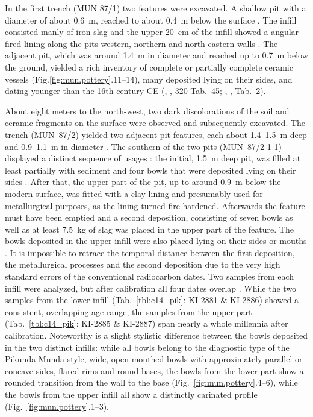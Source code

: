 \documentclass[a4paper]{article}
\begin{document}
In the first trench (MUN 87/1) two features were excavated. A shallow pit with a diameter of about 0.6~m, reached to about 0.4~m below the surface \citep[311--321]{Seidensticker.2021e}. The infill consisted manly of iron slag and the upper 20~cm of the infill showed a angular fired lining along the pits western, northern and north-eastern walls \citep[315 Fig. 151--152]{Seidensticker.2021e}. The adjacent pit, which was around 1.4~m in diameter and reached up to 0.7~m below the ground, yielded a rich inventory of complete or partially complete ceramic vessels (Fig.\ref{fig:mun.pottery}.11--14), many deposited lying on their sides, and dating younger than the 16th century CE (\citeauthor{Seidensticker.2021e}, \citeyear{Seidensticker.2021e}, 320 Tab.~45; \citeauthor{Seidensticker.2024}, \citeyear{Seidensticker.2024}, Tab.~2). 

About eight meters to the north-west, two dark discolorations of the soil and ceramic fragments on the surface were observed and subsequently excavated. The trench (MUN~87/2) yielded two adjacent pit features, each about 1.4--1.5~m deep and 0.9--1.1~m in diameter \citep[321--335]{Seidensticker.2021e}. The southern of the two pits (MUN~87/2-1-1) displayed a distinct sequence of usages \citep[329 Fig.~163]{Seidensticker.2021e}: the initial, 1.5~m deep pit, was filled at least partially with sediment and four bowls \citep[473 Pl.~91.6--8]{Seidensticker.2021e} that were deposited lying on their sides \citep[323 Fig.157G--H]{Seidensticker.2021e}. After that, the upper part of the pit, up to around 0.9~m below the modern surface, was fitted with a clay lining and presumably used for metallurgical purposes, as the lining turned fire-hardened. Afterwards the feature must have been emptied and a second deposition, consisting of seven bowls \citep[473 Pl.~91.1--5]{Seidensticker.2021e} as well as at least 7.5~kg of slag was placed in the upper part of the feature. The bowls deposited in the upper infill were also placed lying on their sides or mouths \citep[323 Fig.157A--E]{Seidensticker.2021e}. It is impossible to retrace the temporal distance between the first deposition, the metallurgical processes and the second deposition due to the very high standard errors of the conventional radiocarbon dates. Two samples from each infill were analyzed, but after calibration all four dates overlap \citep[328 Fig.~162]{Seidensticker.2021e}. While the two samples from the lower infill (Tab.~\ref{tbl:c14_pik}: KI-2881 \& KI-2886) showed a consistent, overlapping age range, the samples from the upper part (Tab.~\ref{tbl:c14_pik}: KI-2885 \& KI-2887) span nearly a whole millennia after calibration. Noteworthy is a slight stylistic difference between the bowls deposited in the two distinct infills: while all bowls belong to the diagnostic type of the Pikunda-Munda style, wide, open-mouthed bowls with approximately parallel or concave sides, flared rims and round bases, the bowls from the lower part show a rounded transition from the wall to the base (Fig.~\ref{fig:mun.pottery}.4--6), while the bowls from the upper infill all show a distinctly carinated profile (Fig.~\ref{fig:mun.pottery}.1--3). 
\end{document}
